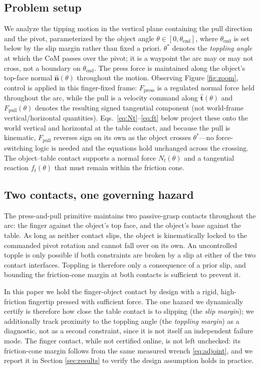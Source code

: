 \documentclass[10pt, conference]{IEEEtran}
\begin{document}
\subsection{Problem setup} We analyze the tipping motion in the vertical plane containing the pull direction and the pivot, parameterized by the object angle $\theta \in [0, \theta_{\mathrm{end}}]$, where $\theta_{\mathrm{end}}$ is set below by the slip margin rather than fixed a priori. $\theta^{*}$ denotes the \emph{toppling angle} at which the CoM passes over the pivot; it is a waypoint the arc may or may not cross, not a boundary on $\theta_{\mathrm{end}}$. The press force is maintained along the object's top-face normal $\hat{\mathbf{n}}(\theta)$ throughout the motion. Observing Figure \ref{fig:zoom}, control is applied in this finger-fixed frame: $F_{\mathrm{press}}$ is a regulated normal force held throughout the arc, while the pull is a velocity command along $\hat{\mathbf{t}}(\theta)$ and $F_{\mathrm{pull}}(\theta)$ denotes the resulting signed tangential component (not world-frame vertical/horizontal quantities). Eqs.~\eqref{eq:Nt}--\eqref{eq:ft} below project these onto the world vertical and horizontal at the table contact, and because the pull is kinematic, $F_{\mathrm{pull}}$ reverses sign on its own as the object crosses $\theta^{*}$---no force-switching logic is needed and the equations hold unchanged across the crossing. The object--table contact supports a normal force $N_t(\theta)$ and a tangential reaction $f_t(\theta)$ that must remain within the friction cone.

\subsection{Two contacts, one governing hazard}
The press-and-pull primitive maintains two passive-grasp contacts throughout the arc: the finger against the object's top face, and the object's base against the table. As long as neither contact slips, the object is kinematically locked to the commanded pivot rotation and cannot fall over on its own. An uncontrolled topple is only possible if both constraints are broken by a slip at either of the two contact interfaces. Toppling is therefore only a consequence of a prior slip, and bounding the friction-cone margin at both contacts is sufficient to prevent it. 

In this paper we hold the finger-object contact by design with a rigid, high-friction fingertip pressed with sufficient force. The one hazard we dynamically certify is therefore how close the table contact is to slipping (the \emph{slip margin}); we additionally track proximity to the toppling angle (the \emph{toppling margin}) as a diagnostic, not as a second constraint, since it is not itself an independent failure mode. The finger contact, while not certified online, is not left unchecked: its friction-cone margin follows from the same measured wrench \eqref{eq:adjoint}, and we report it in Section \ref{sec:results} to verify the design assumption holds in practice.
\end{document}
